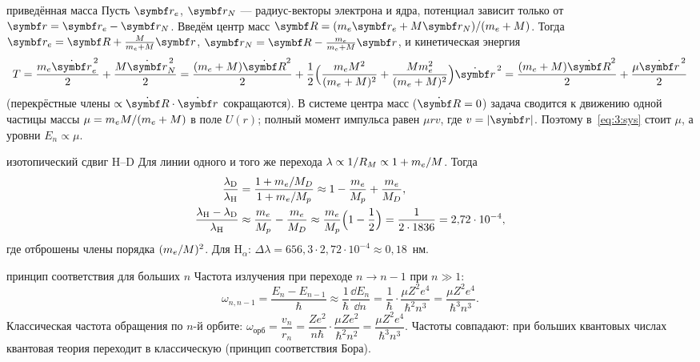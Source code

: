 \begin{derivation}[label=der:3:reduced]{приведённая масса}
Пусть $\vect r_e$, $\vect r_N$ — радиус-векторы электрона и ядра, потенциал зависит только от
$\vect r=\vect r_e-\vect r_N$. Введём центр масс $\vect R=(\mel\vect r_e+M\vect r_N)/(\mel+M)$.
Тогда $\vect r_e=\vect R+\frac{M}{\mel+M}\vect r$, $\vect r_N=\vect R-\frac{\mel}{\mel+M}\vect r$, и
кинетическая энергия
\[
  T=\frac{\mel\dot{\vect r}_e^{\,2}}{2}+\frac{M\dot{\vect r}_N^{\,2}}{2}
   =\frac{(\mel+M)\dot{\vect R}^2}{2}+\frac12\Bigl(\frac{\mel M^2}{(\mel+M)^2}+\frac{M\mel^2}{(\mel+M)^2}\Bigr)\dot{\vect r}^{\,2}
   =\frac{(\mel+M)\dot{\vect R}^2}{2}+\frac{\mu\dot{\vect r}^{\,2}}{2}
\]
(перекрёстные члены $\propto\dot{\vect R}\cdot\dot{\vect r}$ сокращаются). В системе центра масс
($\dot{\vect R}=0$) задача сводится к движению одной частицы массы $\mu=m_e M/(m_e+M)$ в поле
$U(r)$; полный момент импульса равен $\mu r v$, где $v=|\dot{\vect r}|$. Поэтому в~\eqref{eq:3:sys}
стоит $\mu$, а уровни $E_n\propto\mu$.
\end{derivation}

\begin{derivation}[label=der:3:isotope]{изотопический сдвиг H--D}
Для линии одного и того же перехода $\lambda\propto1/R_M\propto1+m_e/M$. Тогда
\begin{align*}
  \frac{\lambda_{\mathrm D}}{\lambda_{\mathrm H}}&=\frac{1+m_e/M_D}{1+m_e/M_p}
  \approx1-\frac{m_e}{M_p}+\frac{m_e}{M_D},\\
  \frac{\lambda_{\mathrm H}-\lambda_{\mathrm D}}{\lambda_{\mathrm H}}&\approx\frac{m_e}{M_p}-\frac{m_e}{M_D}
  \approx\frac{m_e}{M_p}\Bigl(1-\frac12\Bigr)=\frac{1}{2\cdot1836}=2{,}72\cdot10^{-4},
\end{align*}
где отброшены члены порядка $(m_e/M)^2$. Для $\mathrm H_\alpha$: $\Delta\lambda=656{,}3\cdot2{,}72\cdot10^{-4}\approx0{,}18$~нм.
\end{derivation}

\begin{derivation}[label=der:3:corr]{принцип соответствия для больших $n$}
Частота излучения при переходе $n\to n-1$ при $n\gg1$:
\[
  \omega_{n,n-1}=\frac{E_n-E_{n-1}}{\hbar}\approx\frac{1}{\hbar}\frac{\dd E_n}{\dd n}
  =\frac{1}{\hbar}\cdot\frac{\mu Z^2e^4}{\hbar^2n^3}=\frac{\mu Z^2e^4}{\hbar^3n^3}.
\]
Классическая частота обращения по $n$-й орбите:
$\omega_{\text{орб}}=\dfrac{v_n}{r_n}=\dfrac{Ze^2}{n\hbar}\cdot\dfrac{\mu Ze^2}{\hbar^2n^2}=\dfrac{\mu Z^2e^4}{\hbar^3n^3}$.
Частоты совпадают: при больших квантовых числах квантовая теория переходит в классическую
(принцип соответствия Бора).
\end{derivation}

